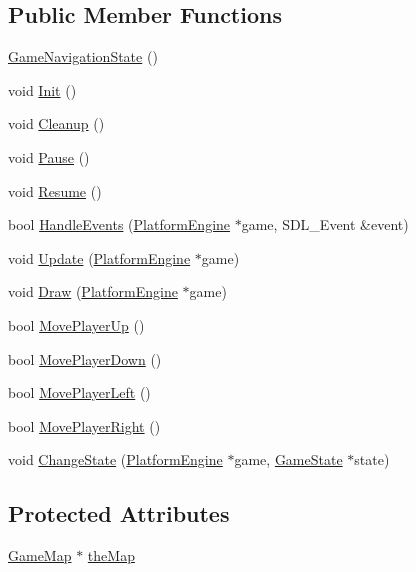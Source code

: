 \subsection*{Public Member Functions}
\begin{CompactItemize}
\item 
\hyperlink{class_game_navigation_state_6a3b93831c85eb5dc3de0a53ca13ddfc}{GameNavigationState} ()
\item 
void \hyperlink{class_game_navigation_state_8f613860bf544476ab9cff9fb7f98201}{Init} ()
\item 
void \hyperlink{class_game_navigation_state_f93a7dbb7eac4b14a6d59cbca32b9abd}{Cleanup} ()
\item 
void \hyperlink{class_game_navigation_state_ac626b511de8af9f32b7a1492a10f861}{Pause} ()
\item 
void \hyperlink{class_game_navigation_state_4d6aee55eddb1978f493206d985fb950}{Resume} ()
\item 
bool \hyperlink{class_game_navigation_state_6e7c13d35a33478673c62ae55394cfdc}{HandleEvents} (\hyperlink{class_platform_engine}{PlatformEngine} $\ast$game, SDL\_\-Event \&event)
\item 
void \hyperlink{class_game_navigation_state_90f5e6d6287a875d8f2737180f46a004}{Update} (\hyperlink{class_platform_engine}{PlatformEngine} $\ast$game)
\item 
void \hyperlink{class_game_navigation_state_a37dce070a906454c512192c067fda09}{Draw} (\hyperlink{class_platform_engine}{PlatformEngine} $\ast$game)
\item 
bool \hyperlink{class_game_navigation_state_fd803365fe0a32b60cf9105ee45b4042}{MovePlayerUp} ()
\item 
bool \hyperlink{class_game_navigation_state_66f8a21e63270473d88b31b06d306111}{MovePlayerDown} ()
\item 
bool \hyperlink{class_game_navigation_state_b8ee346a4f4be2cc3478fdacfb770464}{MovePlayerLeft} ()
\item 
bool \hyperlink{class_game_navigation_state_0b505a64bcf97883bb9e15d0d008174e}{MovePlayerRight} ()
\item 
void \hyperlink{class_game_state_f786aeb704a22a135dc289bb89fcc452}{ChangeState} (\hyperlink{class_platform_engine}{PlatformEngine} $\ast$game, \hyperlink{class_game_state}{GameState} $\ast$state)
\end{CompactItemize}
\subsection*{Protected Attributes}
\begin{CompactItemize}
\item 
\hyperlink{class_game_map}{GameMap} $\ast$ \hyperlink{class_game_navigation_state_83154f9523275696f30c13447e1d74f3}{theMap}
\end{CompactItemize}


